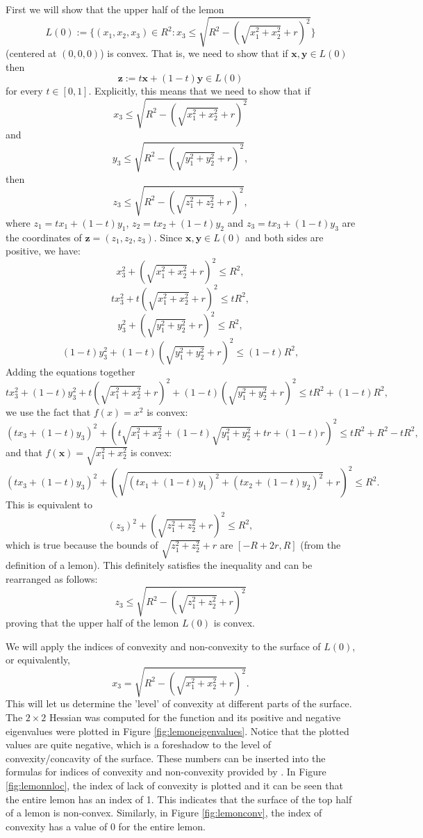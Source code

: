 \documentclass[12pt]{article}
\numberwithin{equation}{section}
\numberwithin{figure}{section}
\numberwithin{table}{section}
\theoremstyle{definition}
\theoremstyle{remark}
\numberwithin{equation}{section}
\begin{document}
First we will show that the upper half of the lemon
\[
L(0) := \{ (x_{1}, x_{2}, x_{3}) \in R^{2}: x_{3} \leq \sqrt{R^{2} - (\sqrt{x_{1}^{2} + x_{2}^{2}} + r)^{2}} \}
\]
 (centered at $(0, 0, 0)$) is convex. That is, we need to show that if $\mathbf{x},\mathbf{y} \in L(0)$ then 
\[
\mathbf{z} := t\mathbf{x} + (1-t)\mathbf{y} \in L(0)
\]
for every $t \in [0, 1]$. Explicitly, this means that we need to show that if 
\[
x_{3} \leq \sqrt{R^{2} - (\sqrt{x_{1}^{2} + x_{2}^{2}} + r)^{2}}
\]
and
\[
y_{3} \leq \sqrt{R^{2} - (\sqrt{y_{1}^{2} + y_{2}^{2}} + r)^{2}},
\]
then
\[
z_{3} \leq \sqrt{R^{2} - (\sqrt{z_{1}^{2} + z_{2}^{2}} + r)^{2}},
\]
where $z_{1} = tx_{1} + (1-t)y_{1}$, $z_{2} = tx_{2} + (1-t)y_{2}$ and $z_{3} = tx_{3} + (1-t)y_{3}$ are the coordinates of $\mathbf{z}=(z_{1}, z_{2}, z_{3})$. Since $\mathbf{x}, \mathbf{y} \in L(0)$ and both sides are positive, we have:
\[
x_{3}^{2} +(\sqrt{x_{1}^{2} + x_{2}^{2}} + r)^{2} \leq R^{2},
\]
\[
tx_{3}^{2} + t(\sqrt{x_{1}^{2} + x_{2}^{2}} + r)^{2} \leq tR^{2},
\]
\[
y_{3}^{2} +(\sqrt{y_{1}^{2} + y_{2}^{2}} + r)^{2} \leq R^{2},
\]
\[
(1 - t)y_{3}^{2} + (1 - t)(\sqrt{y_{1}^{2} + y_{2}^{2}} + r)^{2} \leq (1 - t)R^{2},
\]
Adding the equations together
\[
tx_{3}^{2} + (1 - t)y_{3}^{2} + t(\sqrt{x_{1}^{2} + x_{2}^{2}} + r)^{2} + (1 - t)(\sqrt{y_{1}^{2} + y_{2}^{2}} + r)^{2} \leq tR^{2} + (1 - t)R^{2},
\]
we use the fact that $f(x) = x^{2}$ is convex:
\[
(tx_{3} + (1 - t)y_{3})^{2} + (t\sqrt{x_{1}^{2} + x_{2}^{2}} + (1 - t)\sqrt{y_{1}^{2} + y_{2}^{2}} + tr + (1 - t)r)^{2} \leq tR^{2} + R^{2} - tR^{2},
\]
and that $f(\mathbf{x}) = \sqrt{x_{1}^{2} + x_{2}^{2}}$ is convex:
\[
(tx_{3} + (1 - t)y_{3})^{2} + (\sqrt{(tx_{1} + (1 - t)y_{1})^{2} + (tx_{2} + (1  - t)y_{2})^{2}} + r)^{2} \leq R^{2}.
\]
This is equivalent to
\[
(z_{3})^{2} + (\sqrt{z_{1}^{2} + z_{2}^{2}} + r)^{2} \leq R^{2},
\]
which is true because the bounds of $\sqrt{z_{1}^{2} + z_{2}^{2}} + r$ are $[-R+2r, R]$ (from the definition of a lemon). This definitely satisfies the inequality and can be rearranged as follows:
\[
z_{3} \leq \sqrt{R^{2} - (\sqrt{z_{1}^{2} + z_{2}^{2}} + r)^{2}}
\]
proving that the upper half of the lemon $L(0)$ is convex.

We will apply the indices of convexity and non-convexity to the surface of $L(0)$, or equivalently, 
\[
x_{3} = \sqrt{R^{2} - (\sqrt{x_{1}^{2} + x_{2}^{2}} + r)^{2}}. 
\]
This will let us determine the 'level' of convexity at different parts of the surface. The $2 \times 2$ Hessian was computed for the function and its positive and negative eigenvalues were plotted in Figure \ref{fig:lemoneigenvalues}. Notice that the plotted values are quite negative, which is a foreshadow to the level of convexity/concavity of the surface. These numbers can be inserted into the formulas for indices of convexity and non-convexity provided by \cite{DMZ2019}. In Figure \ref{fig:lemonnloc}, the index of lack of convexity is plotted and it can be seen that the entire lemon has an index of 1. This indicates that the surface of the top half of a lemon is non-convex. Similarly, in Figure \ref{fig:lemonconv}, the index of convexity has a value of 0 for the entire lemon.
\end{document}
